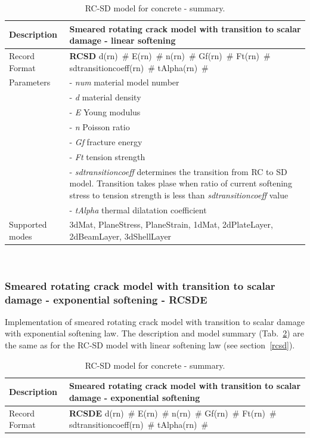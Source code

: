 \documentclass[a4paper]{article}
\newcommand{\descitem}[1]{{\noindent \bf #1}}
\newcommand{\elemparam}[2]{{{#1\tiny (#2)}~\#}}
\newcommand{\param}[1]{{\it #1}}
\newenvironment{mmt}{\begin{tabular}{|l|p{9cm}|}}{\end{tabular}\\}
\newenvironment{mmt}{\begin{tabular}{|l|l|}}{\end{tabular}\\}
\begin{document}
\begin{table}[!htb]
\begin{mmt}
\hline
Description & Smeared rotating crack model with transition to scalar
damage - linear softening\\
\hline
Record Format & \descitem{RCSD} \elemparam{d}{rn} \elemparam{E}{rn}
\elemparam{n}{rn} \elemparam{Gf}{rn} \elemparam{Ft}{rn} \elemparam{sdtransitioncoeff}{rn} \elemparam{tAlpha}{rn} \\
Parameters &- \param{num} material model number\\
&- \param{d} material density\\
&- \param{E} Young modulus\\
&- \param{n} Poisson ratio\\
&- \param{Gf} fracture energy\\
&- \param{Ft} tension strength\\
&- \param{sdtransitioncoeff} determines the transition from RC to SD
model. Transition takes plase when ratio of current softening
stress to tension strength is less than  \param{sdtransitioncoeff} value\\
&- \param{tAlpha} thermal dilatation coefficient\\
Supported modes& 3dMat, PlaneStress, PlaneStrain, 1dMat,
2dPlateLayer, 2dBeamLayer, 3dShellLayer\\
\hline
\end{mmt}
\caption{RC-SD model for  concrete - summary.}
\label{rcsd_table}
\end{table}



\subsubsection{Smeared rotating crack model with transition to scalar
damage - exponential softening - RCSDE}
\label{rcsde}
Implementation of smeared rotating crack model with transition to
scalar damage with exponential softening law.
The description and model summary (Tab.~\ref{rcsde_table}) are the
same as for the RC-SD model with linear softening law (see section~\ref{rcsd}).
\begin{table}[!htb]
\begin{mmt}
\hline
Description & Smeared rotating crack model with transition to scalar
damage - exponential softening\\
\hline
Record Format & \descitem{RCSDE} \elemparam{d}{rn} \elemparam{E}{rn}
\elemparam{n}{rn} \elemparam{Gf}{rn} \elemparam{Ft}{rn} \elemparam{sdtransitioncoeff}{rn} \elemparam{tAlpha}{rn} \\
\hline
\end{mmt}
\caption{RC-SD model for  concrete - summary.}
\label{rcsde_table}
\end{table}
\end{document}
